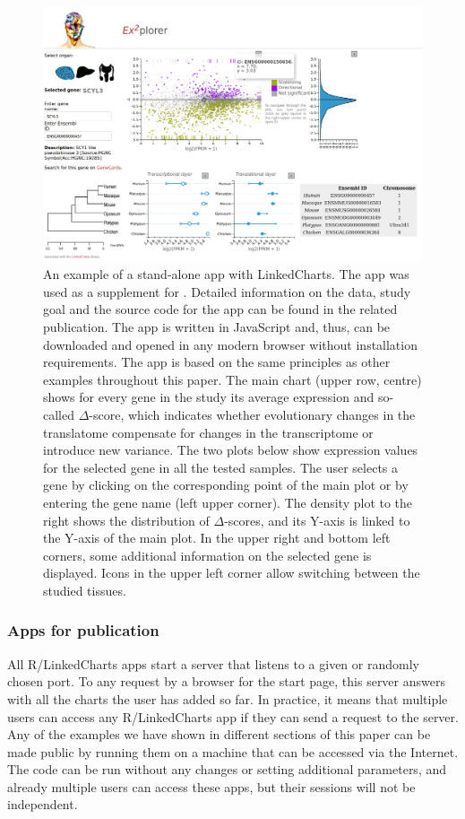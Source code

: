 \documentclass[twocolumn,10pt]{article}
\begin{document}
\begin{figure}[t]
   \includegraphics[width=\textwidth]{FigF/figF.png}
   \caption{An example of a stand-alone app with LinkedCharts. The app was used as a supplement for \cite{wang_2020}. Detailed information on the data, study goal and the source code for the app can be found in the related publication. The app is written in JavaScript and, thus, can be downloaded and opened in any modern browser without installation requirements. The app is based on the same principles as other examples throughout this paper. The main chart (upper row, centre) shows for every gene in the study its average expression and so-called $\Delta$-score, which indicates whether evolutionary changes in the translatome compensate for changes in the transcriptome or introduce new variance. The two plots below show expression values for the selected gene in all the tested samples. The user selects a gene by clicking on the corresponding point of the main plot or by entering the gene name (left upper corner). The density plot to the right shows the distribution of $\Delta$-scores, and its Y-axis is linked to the Y-axis of the main plot. In the upper right and bottom left corners, some additional information on the selected gene is displayed. Icons in the upper left corner allow switching between the studied tissues.}
   \label{FigF}
\end{figure}

\subsubsection{Apps for publication}

All R/LinkedCharts apps start a server that listens to a given or randomly chosen port. To any request by a browser for the start page, this server answers with all the charts the user has added so far. In practice, it means that multiple users can access any R/LinkedCharts app if they can send a request to the server. Any of the examples we have shown in different sections of this paper can be made public by running them on a machine that can be accessed via the Internet. The code can be run without any changes or setting additional parameters, and already multiple users can access these apps, but their sessions will not be independent.
\end{document}
